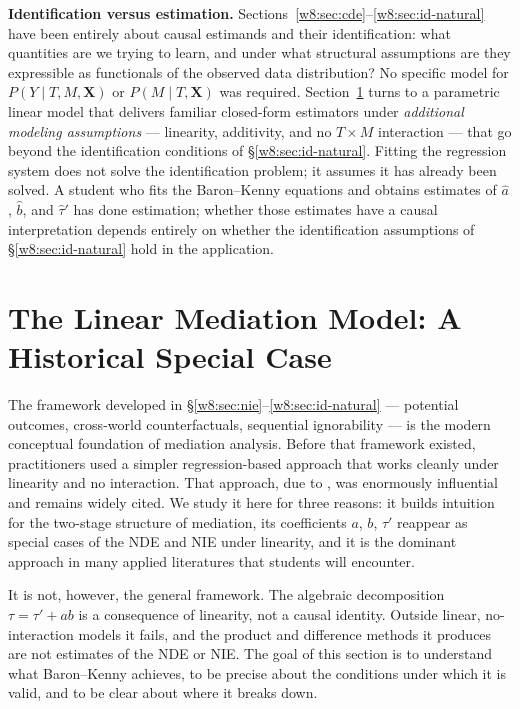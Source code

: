 \documentclass[master.tex]{subfiles}
\begin{document}
\medskip\noindent\textbf{Identification versus estimation.}
Sections~\ref{w8:sec:cde}--\ref{w8:sec:id-natural} have been entirely
about causal estimands and their identification: what quantities are we
trying to learn, and under what structural assumptions are they
expressible as functionals of the observed data distribution?  No
specific model for $P(Y \mid T, M, \mathbf{X})$ or
$P(M \mid T, \mathbf{X})$ was required.  Section~\ref{w8:sec:linear}
turns to a parametric linear model that delivers familiar closed-form
estimators under \emph{additional modeling assumptions} --- linearity,
additivity, and no $T \times M$ interaction --- that go beyond the
identification conditions of §\ref{w8:sec:id-natural}.  Fitting the
regression system does not solve the identification problem; it assumes
it has already been solved.  A student who fits the Baron--Kenny
equations and obtains estimates of $\hat a$, $\hat b$, and $\hat\tau'$
has done estimation; whether those estimates have a causal
interpretation depends entirely on whether the identification
assumptions of §\ref{w8:sec:id-natural} hold in the application.

\section{The Linear Mediation Model: A Historical Special Case}
\label{w8:sec:linear}

The framework developed in §\ref{w8:sec:nie}--\ref{w8:sec:id-natural}
--- potential outcomes, cross-world counterfactuals, sequential
ignorability --- is the modern conceptual foundation of mediation
analysis.  Before that framework existed, practitioners used a simpler
regression-based approach that works cleanly under linearity and no
interaction.  That approach, due to \citet{baron1986moderator}, was
enormously influential and remains widely cited.  We study it here for
three reasons: it builds intuition for the two-stage structure of
mediation, its coefficients $a$, $b$, $\tau'$ reappear as special cases
of the NDE and NIE under linearity, and it is the dominant approach in
many applied literatures that students will encounter.

It is not, however, the general framework.  The algebraic
decomposition $\tau = \tau' + ab$ is a consequence of linearity, not a
causal identity.  Outside linear, no-interaction models it fails, and
the product and difference methods it produces are not estimates of the
NDE or NIE.  The goal of this section is to understand what Baron--Kenny
achieves, to be precise about the conditions under which it is valid,
and to be clear about where it breaks down.
\end{document}
